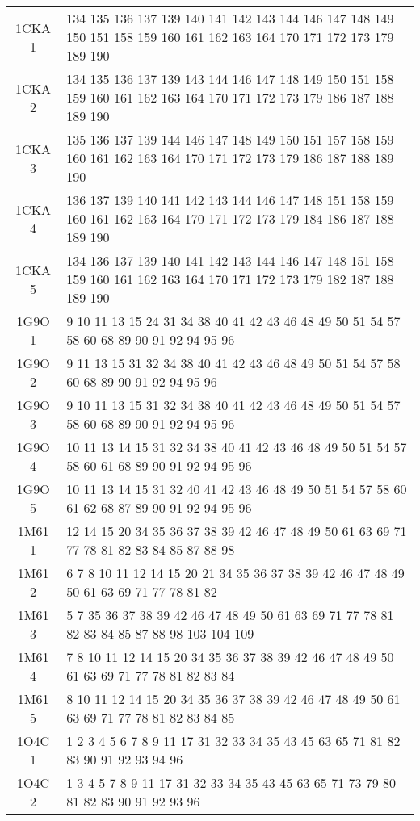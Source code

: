 \begin{table}[!htbp]
{\begin{tabular}{cl}
        1CKA 1 & 134 135 136 137 139 140 141 142 143 144 146 147 148 149 150 151 158 159 160 161 162 163 164 170 171 172 173 179 189 190 \\
        1CKA 2 & 134 135 136 137 139 143 144 146 147 148 149 150 151 158 159 160 161 162 163 164 170 171 172 173 179 186 187 188 189 190 \\
        1CKA 3 & 135 136 137 139 144 146 147 148 149 150 151 157 158 159 160 161 162 163 164 170 171 172 173 179 186 187 188 189 190 \\
        1CKA 4 & 136 137 139 140 141 142 143 144 146 147 148 151 158 159 160 161 162 163 164 170 171 172 173 179 184 186 187 188 189 190 \\
        1CKA 5 & 134 136 137 139 140 141 142 143 144 146 147 148 151 158 159 160 161 162 163 164 170 171 172 173 179 182 187 188 189 190 \\
        1G9O 1 & 9 10 11 13 15 24 31 34 38 40 41 42 43 46 48 49 50 51 54 57 58 60 68 89 90 91 92 94 95 96 \\
        1G9O 2 & 9 11 13 15 31 32 34 38 40 41 42 43 46 48 49 50 51 54 57 58 60 68 89 90 91 92 94 95 96 \\
        1G9O 3 & 9 10 11 13 15 31 32 34 38 40 41 42 43 46 48 49 50 51 54 57 58 60 68 89 90 91 92 94 95 96 \\
        1G9O 4 & 10 11 13 14 15 31 32 34 38 40 41 42 43 46 48 49 50 51 54 57 58 60 61 68 89 90 91 92 94 95 96 \\
        1G9O 5 & 10 11 13 14 15 31 32 40 41 42 43 46 48 49 50 51 54 57 58 60 61 62 68 87 89 90 91 92 94 95 96 \\
        1M61 1 & 12 14 15 20 34 35 36 37 38 39 42 46 47 48 49 50 61 63 69 71 77 78 81 82 83 84 85 87 88 98 \\
        1M61 2 & 6 7 8 10 11 12 14 15 20 21 34 35 36 37 38 39 42 46 47 48 49 50 61 63 69 71 77 78 81 82 \\
        1M61 3 & 5 7 35 36 37 38 39 42 46 47 48 49 50 61 63 69 71 77 78 81 82 83 84 85 87 88 98 103 104 109 \\
        1M61 4 & 7 8 10 11 12 14 15 20 34 35 36 37 38 39 42 46 47 48 49 50 61 63 69 71 77 78 81 82 83 84 \\
        1M61 5 & 8 10 11 12 14 15 20 34 35 36 37 38 39 42 46 47 48 49 50 61 63 69 71 77 78 81 82 83 84 85 \\
        1O4C 1 & 1 2 3 4 5 6 7 8 9 11 17 31 32 33 34 35 43 45 63 65 71 81 82 83 90 91 92 93 94 96\\
        1O4C 2 & 1 3 4 5 7 8 9 11 17 31 32 33 34 35 43 45 63 65 71 73 79 80 81 82 83 90 91 92 93 96\\

\end{tabular}}
\end{table}
